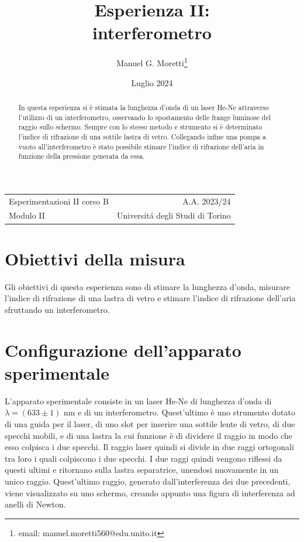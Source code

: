 \documentclass{article}
\title{Esperienza II: \\ interferometro}
\author{Manuel G. Moretti\footnote{email: manuel.moretti560@edu.unito.it}}
\date{Luglio 2024}
\begin{document}
\maketitle

\begin{center}
\begin{tabular}{l r}
Esperimentazioni II corso B & A.A. 2023/24 \\
Modulo II & Universit\'{a} degli Studi di Torino \\
\end{tabular}
\end{center}

\begin{abstract}
In questa esperienza si è stimata la lunghezza d'onda di un laser He-Ne attraverso l'utilizzo di un interferometro, osservando lo spostamento delle frange luminose del raggio sullo schermo. Sempre con lo stesso metodo e strumento si è determinato l'indice di rifrazione di una sottile lastra di vetro. Collegando infine una pompa a vuoto all'interferometro è stato possibile stimare l'indice di rifrazione dell'aria in funzione della pressione generata da essa. 
\end{abstract}

\section{Obiettivi della misura}
Gli obiettivi di questa esperienza sono di stimare la  lunghezza d'onda, misurare l'indice di rifrazione di una lastra di vetro e stimare l'indice di rifrazione dell'aria sfruttando un interferometro. 
\section{Configurazione dell'apparato sperimentale}
L'apparato sperimentale consiste in un laser He-Ne di lunghezza d'onda di $\lambda=(633\pm 1)$ nm e di un interferometro. Quest'ultimo è uno strumento dotato di una guida per il laser, di uno slot per inserire una sottile lente di vetro, di due specchi mobili, e di una lastra la cui funzione è di dividere il raggio in modo che esso colpisca i due specchi. Il raggio laser quindi si divide in due raggi ortogonali tra loro i quali colpiscono i due specchi. I due raggi quindi vengono riflessi da questi ultimi e ritornano sulla lastra separatrice, unendosi nuovamente in un unico raggio. Quest'ultimo raggio, generato dall'interferenza dei due precedenti, viene visualizzato su uno schermo, creando appunto una figura di interferenza ad anelli di Newton.
\end{document}
